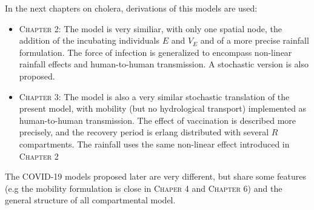 In the next chapters on cholera, derivations of this models are used:
\begin{itemize}
	\item \textsc{Chapter 2}: The model is very similiar, with only one spatial node, the addition of the incubating individuals $E$ and $V_E$ and of a more precise rainfall formulation. The force of infection is generalized to encompass non-linear rainfall effects and human-to-human transmission. A stochastic version is also proposed.
	\item  \textsc{Chapter 3}: The model is also a very similar stochastic translation of the present model, with mobility (but no hydrological transport) implemented as human-to-human transmission. The effect of vaccination is described more precisely, and the recovery period is erlang distributed with several $R$ compartments. The rainfall uses the same non-linear effect introduced in \textsc{Chapter 2}
\end{itemize}
The COVID-19 models proposed later are very different, but share some features (e.g the mobility formulation is close in \textsc{Chaper 4} and \textsc{Chapter 6}) and the general structure of all compartmental model.







